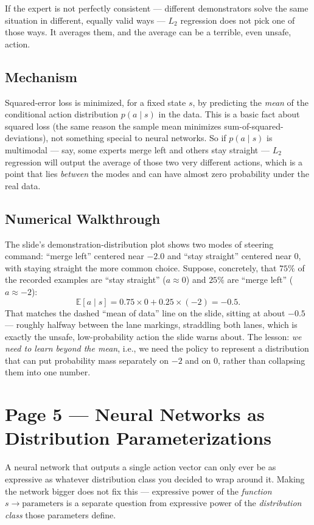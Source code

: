 \documentclass[11pt]{article}
\begin{document}
If the expert is not perfectly consistent --- different demonstrators solve the same situation in different, equally valid ways --- $L_2$ regression does not pick one of those ways. It averages them, and the average can be a terrible, even unsafe, action.

\subsection*{Mechanism}

Squared-error loss is minimized, for a fixed state $s$, by predicting the \emph{mean} of the conditional action distribution $p(a\mid s)$ in the data. This is a basic fact about squared loss (the same reason the sample mean minimizes sum-of-squared-deviations), not something special to neural networks. So if $p(a\mid s)$ is multimodal --- say, some experts merge left and others stay straight --- $L_2$ regression will output the average of those two very different actions, which is a point that lies \emph{between} the modes and can have almost zero probability under the real data.

\subsection*{Numerical Walkthrough}

The slide's demonstration-distribution plot shows two modes of steering command: ``merge left'' centered near $-2.0$ and ``stay straight'' centered near $0$, with staying straight the more common choice. Suppose, concretely, that $75\%$ of the recorded examples are ``stay straight'' ($a \approx 0$) and $25\%$ are ``merge left'' ($a \approx -2$):
\[
\mathbb{E}[a \mid s] = 0.75 \times 0 + 0.25 \times (-2) = -0.5.
\]
That matches the dashed ``mean of data'' line on the slide, sitting at about $-0.5$ --- roughly halfway between the lane markings, straddling both lanes, which is exactly the unsafe, low-probability action the slide warns about. The lesson: \emph{we need to learn beyond the mean}, i.e., we need the policy to represent a distribution that can put probability mass separately on $-2$ and on $0$, rather than collapsing them into one number.

\section*{Page 5 --- Neural Networks as Distribution Parameterizations}

A neural network that outputs a single action vector can only ever be as expressive as whatever distribution class you decided to wrap around it. Making the network bigger does not fix this --- expressive power of the \emph{function} $s \to \text{parameters}$ is a separate question from expressive power of the \emph{distribution class} those parameters define.
\end{document}
